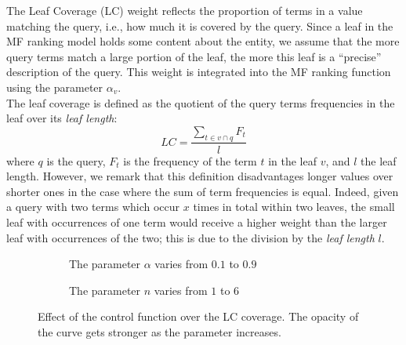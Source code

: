 The Leaf Coverage (LC) weight reflects the proportion of terms in a value matching the query, i.e., how much it is covered by the query. Since a leaf in the MF ranking model holds some content about the entity, we assume that the more query terms match a large portion of the leaf, the more this leaf is a ``precise'' description of the query. This weight is integrated into the MF ranking function using the parameter $\alpha_v$.\\

The leaf coverage is defined as the quotient of the query terms frequencies in the leaf over its \emph{leaf length}:
$$
LC = \frac{\sum_{t\in v \cap q}{F_t}}{l}
$$
where $q$ is the query, $F_t$ is the frequency of the term $t$ in the leaf $v$, and $l$ the leaf length.
However, we remark that this definition disadvantages longer values over shorter ones in the case where the sum of term frequencies is equal. Indeed, given a query with two terms which occur $x$ times in total within two leaves, the small leaf with occurrences of one term would receive a higher weight than the larger leaf with occurrences of the two; this is due to the division by the \emph{leaf length} $l$.\\

\begin{figure}
	\centering
	\begin{subfigure}{.45\textwidth}
		\centering
		\caption{The parameter $\alpha$ varies from $0.1$ to $0.9$}
	\end{subfigure}
	\qquad
	\begin{subfigure}{.45\textwidth}
		\centering
		\caption{The parameter $n$ varies from $1$ to $6$}
	\end{subfigure}
	\caption{Effect of the control function over the LC coverage. The opacity of the curve gets stronger as the parameter increases.}
	\label{fig:control-function}
\end{figure}

